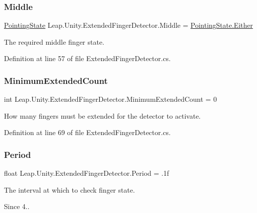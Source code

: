 \subsubsection{\texorpdfstring{Middle}{Middle}}
{\footnotesize\ttfamily \mbox{\hyperlink{namespace_leap_1_1_unity_a1d316bf483102971171646a20de176fc}{Pointing\+State}} Leap.\+Unity.\+Extended\+Finger\+Detector.\+Middle = \mbox{\hyperlink{namespace_leap_1_1_unity_a1d316bf483102971171646a20de176fca9e70a5d3dab1960c04b55a29f310331e}{Pointing\+State.\+Either}}}

The required middle finger state. 

Definition at line 57 of file Extended\+Finger\+Detector.\+cs.

\mbox{\label{class_leap_1_1_unity_1_1_extended_finger_detector_ab5759c120d7bcc6c3c2d779089689b3a}} 
\subsubsection{\texorpdfstring{MinimumExtendedCount}{MinimumExtendedCount}}
{\footnotesize\ttfamily int Leap.\+Unity.\+Extended\+Finger\+Detector.\+Minimum\+Extended\+Count = 0}

How many fingers must be extended for the detector to activate. 

Definition at line 69 of file Extended\+Finger\+Detector.\+cs.

\mbox{\label{class_leap_1_1_unity_1_1_extended_finger_detector_a0e8262d14702fa8b2e7dc55c721d651e}} 
\subsubsection{\texorpdfstring{Period}{Period}}
{\footnotesize\ttfamily float Leap.\+Unity.\+Extended\+Finger\+Detector.\+Period = .\+1f}

The interval at which to check finger state. \begin{DoxySince}{Since}
4.. 
\end{DoxySince}


